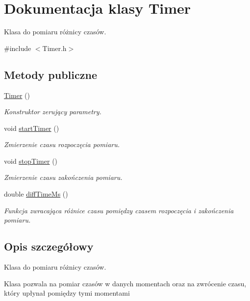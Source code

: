 \hypertarget{class_timer}{\section{Dokumentacja klasy Timer}
\label{class_timer}
}


Klasa do pomiaru różnicy czasów.  




{\ttfamily \#include $<$Timer.\-h$>$}

\subsection*{Metody publiczne}
\begin{DoxyCompactItemize}
\item 
\hyperlink{class_timer_a5f16e8da27d2a5a5242dead46de05d97}{Timer} ()
\begin{DoxyCompactList}\small\item\em Konstruktor zerujący parametry. \end{DoxyCompactList}\item 
void \hyperlink{class_timer_aa8c887576ec3b0d68c10ebf4097c367c}{start\-Timer} ()
\begin{DoxyCompactList}\small\item\em Zmierzenie czasu rozpoczęcia pomiaru. \end{DoxyCompactList}\item 
void \hyperlink{class_timer_a27f97da1b1d19ad74a847703ca25c455}{stop\-Timer} ()
\begin{DoxyCompactList}\small\item\em Zmierzenie czasu zakończenia pomiaru. \end{DoxyCompactList}\item 
double \hyperlink{class_timer_afa5d5cd3dab1aa6a67278dffd6a42dbf}{diff\-Time\-Ms} ()
\begin{DoxyCompactList}\small\item\em Funkcja zwracająca różnice czasu pomiędzy czasem rozpoczęcia i zakończenia pomiaru. \end{DoxyCompactList}\end{DoxyCompactItemize}


\subsection{Opis szczegółowy}
Klasa do pomiaru różnicy czasów. 

Klasa pozwala na pomiar czasów w danych momentach oraz na zwrócenie czasu, który upłynał pomiędzy tymi momentami 

